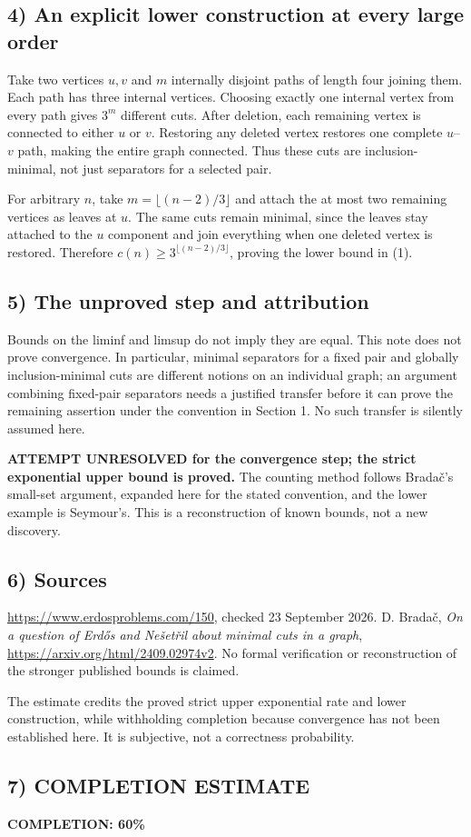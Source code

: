 \subsection*{4) An explicit lower construction at every large order}
Take two vertices $u,v$ and $m$ internally disjoint paths of length four joining them. Each path has three internal vertices. Choosing exactly one internal vertex from every path gives $3^m$ different cuts. After deletion, each remaining vertex is connected to either $u$ or $v$. Restoring any deleted vertex restores one complete $u$--$v$ path, making the entire graph connected. Thus these cuts are inclusion-minimal, not just separators for a selected pair.

For arbitrary $n$, take $m=\lfloor(n-2)/3\rfloor$ and attach the at most two remaining vertices as leaves at $u$. The same cuts remain minimal, since the leaves stay attached to the $u$ component and join everything when one deleted vertex is restored. Therefore $c(n)\ge3^{\lfloor(n-2)/3\rfloor}$, proving the lower bound in (1).

\subsection*{5) The unproved step and attribution}
Bounds on the liminf and limsup do not imply they are equal. This note does not prove convergence. In particular, minimal separators for a fixed pair and globally inclusion-minimal cuts are different notions on an individual graph; an argument combining fixed-pair separators needs a justified transfer before it can prove the remaining assertion under the convention in Section 1. No such transfer is silently assumed here.

\textbf{ATTEMPT UNRESOLVED for the convergence step; the strict exponential upper bound is proved.} The counting method follows Brada\v{c}'s small-set argument, expanded here for the stated convention, and the lower example is Seymour's. This is a reconstruction of known bounds, not a new discovery.

\subsection*{6) Sources}
\url{https://www.erdosproblems.com/150}, checked 23 September 2026. D. Brada\v{c}, \emph{On a question of Erd\H{o}s and Ne\v{s}et\v{r}il about minimal cuts in a graph}, \url{https://arxiv.org/html/2409.02974v2}. No formal verification or reconstruction of the stronger published bounds is claimed.

The estimate credits the proved strict upper exponential rate and lower construction, while withholding completion because convergence has not been established here. It is subjective, not a correctness probability.
\subsection*{7) COMPLETION ESTIMATE}
\textbf{COMPLETION: 60\%}
